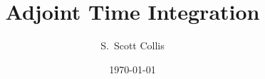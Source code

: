 \documentclass[10pt, oneside]{article}
\title{\Large\bf Adjoint Time Integration}
\author{S.\ Scott Collis}
\date{\today}
\newcommand{\vect}[1]{\mathbf{#1}}
\newcommand{\bA}{\vect{A}}
\newcommand{\bu}{\vect{u}}
\newcommand{\bs}{\vect{s}}
\newcommand{\bw}{\vect{w}}
\newcommand{\bt}{\vect{t}}
\begin{document}
\maketitle

\begin{comment}

\section{Backward Euler}
Starting from the initial condition
\[ u_0 = u(t_0) \]
then the backward Euler method is given by
\[ u_{i} = u_{i-1} + \Delta t f_i \]
\[ u_{i} = u_{i-1} + \Delta t  M_i u_i \]
\[ (I - \Delta t M_i) u_{i} = u_{i-1}  \]
\[  u_{i} = (I - \Delta t M_i)^{-1} u_{i-1}  \]
\[  u_{i} = B_i^{-1} u_{i-1}  \]
where $f_i = f(u_i)$.  Therefore the advancement operator is given by
\[ \bA = 
\begin{bmatrix}
1 & 0 & 0 \\
-B_i^{-1} & 1 & 0 \\
0 & -B_i^{-1} & 1
\end{bmatrix} \]
While has a transpose (adjoint) given by
\[ \tilde\bA = 
\begin{bmatrix}
1 & -B_i^{-T}  & 0 \\
0 & 1 & -B_i^{-T} \\
0 & 0 & 1
\end{bmatrix} \]
The solution vector is given by
\[ \bu = \begin{Bmatrix} 
u_0 \\
u_1  \\
u_n 
\end{Bmatrix}
\]
The right hand side vector is given by
\[ \bs = \begin{Bmatrix} 
u(t_0) \\
0 \\
0 
\end{Bmatrix}
\]
where, in general, it can also have a contribution due to an instead source term.
%
So that the solution is given by
\[ \bA \bu = \bs \]
%
Introducing the adjoint vector $\bw$
\[ \bw^T \bA \bu = \bw^T \bs \]
%
and taking the transpose
\[ \bu^T \bA^T \bw = \bw^T \bs + \bu^T \bt - \bu^T \bt \]
%
Then the adjoint equation is
%
\[ \bA^T \bw = \bt \]
%
and the gradient equation is
%
\[ \bw^T \bs - \bu^T \bt = 0 \]
%
Writing the adjoint out
\[
\begin{bmatrix}
1 & -B_i^{-T}  & 0 \\
0 & 1 & -B_i^{-T} \\
0 & 0 & 1
\end{bmatrix} 
\begin{Bmatrix} 
w_0 \\
w_1  \\
w_n 
\end{Bmatrix}
= \begin{Bmatrix} 
0 \\
0 \\
t_n 
\end{Bmatrix}
\]
The end condition is
\[ w_n = t_n \]
and the first solve would be
\[ w_1 - B_i^{-T} w_n = 0 \]
which is the same as
\[ B_i^T w_1 = w_n \]
Writing this out as an adjoint residual yields
\[ w_1= w_n + \Delta t M^T_i w_1 \]


\end{comment}
\end{document}
